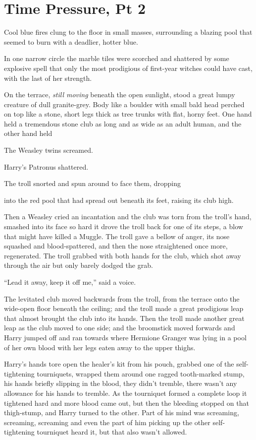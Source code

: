 \chapter{Time Pressure, Pt 2}\label{time-pressure-pt-2}

Cool blue fires clung to the floor in small masses, surrounding a
blazing pool that seemed to burn with a deadlier, hotter blue.

In one narrow circle the marble tiles were scorched and shattered by
some explosive spell that only the most prodigious of first-year witches
could have cast, with the last of her strength.

On the terrace, \emph{still moving} beneath the open sunlight, stood a
great lumpy creature of dull granite-grey. Body like a boulder with
small bald head perched on top like a stone, short legs thick as tree
trunks with flat, horny feet. One hand held a tremendous stone club as
long and as wide as an adult human, and the other hand held

The Weasley twins screamed.

Harry's Patronus shattered.

The troll snorted and spun around to face them, dropping

into the red pool that had spread out beneath its feet, raising its club
high.

Then a Weasley cried an incantation and the club was torn from the
troll's hand, smashed into its face so hard it drove the troll back for
one of its steps, a blow that might have killed a Muggle. The troll gave
a bellow of anger, its nose squashed and blood-spattered, and then the
nose straightened once more, regenerated. The troll grabbed with both
hands for the club, which shot away through the air but only barely
dodged the grab.

``Lead it away, keep it off me,'' said a voice.

The levitated club moved backwards from the troll, from the terrace onto
the wide-open floor beneath the ceiling; and the troll made a great
prodigious leap that almost brought the club into its hands. Then the
troll made another great leap as the club moved to one side; and the
broomstick moved forwards and Harry jumped off and ran towards where
Hermione Granger was lying in a pool of her own blood with her legs
eaten away to the upper thighs.

Harry's hands tore open the healer's kit from his pouch, grabbed one of
the self-tightening tourniquets, wrapped them around one ragged
tooth-marked stump, his hands briefly slipping in the blood, they didn't
tremble, there wasn't any allowance for his hands to tremble. As the
tourniquet formed a complete loop it tightened hard and more blood came
out, but then the bleeding stopped on that thigh-stump, and Harry turned
to the other. Part of his mind was screaming, screaming, screaming and
even the part of him picking up the other self-tightening tourniquet
heard it, but that also wasn't allowed.

